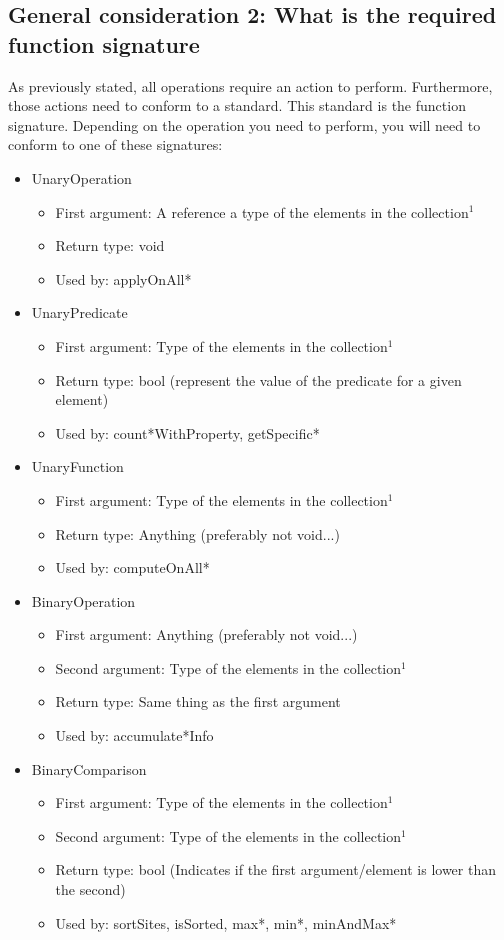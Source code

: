 \documentclass[letterpaper,10pt]{article}
\begin{document}
\subsection{General consideration 2: What is the required function signature}
As previously stated, all operations require an action to perform. Furthermore, those actions need to conform to a standard. This standard is the function signature. Depending on the operation you need to perform, you will need to conform to one of these signatures:
\begin{itemize}
 \item UnaryOperation
  \begin{itemize}
   \item First argument: A reference a type of the elements in the collection$^1$
   \item Return type: void
   \item Used by: applyOnAll*
  \end{itemize}
 \item UnaryPredicate
  \begin{itemize}
   \item First argument: Type of the elements in the collection$^1$
   \item Return type: bool (represent the value of the predicate for a given element)
   \item Used by: count*WithProperty, getSpecific*
  \end{itemize}
 \item UnaryFunction
  \begin{itemize}
   \item First argument: Type of the elements in the collection$^1$
   \item Return type: Anything (preferably not void...)
   \item Used by: computeOnAll*
  \end{itemize}
 \item BinaryOperation
  \begin{itemize}
   \item First argument: Anything (preferably not void...)
   \item Second argument: Type of the elements in the collection$^1$
   \item Return type: Same thing as the first argument
   \item Used by: accumulate*Info
  \end{itemize}
 \item BinaryComparison
  \begin{itemize}
   \item First argument: Type of the elements in the collection$^1$
   \item Second argument: Type of the elements in the collection$^1$
   \item Return type: bool (Indicates if the first argument/element is lower than the second)
   \item Used by: sortSites, isSorted, max*, min*, minAndMax*
  \end{itemize}
\end{itemize}
\end{document}
